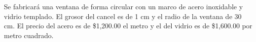 \question Se fabricará una ventana de forma circular con un marco de acero inoxidable y vidrio templado. El grosor del cancel es de 1 cm y el radio de la ventana de 30 cm. El precio del acero es de \$1,200.00 el metro y el del vidrio es de \$1,600.00 por metro cuadrado.

